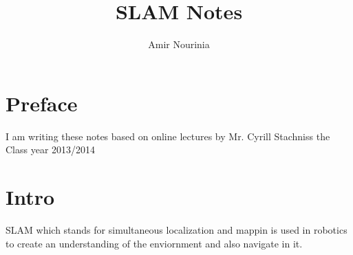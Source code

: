 \documentclass[11pt,twoside,a4paper]{report}
\title{SLAM Notes}
\author{Amir Nourinia}
\begin{document}
    \maketitle
    \tableofcontents


    \section{Preface}
    I am writing these notes based on online lectures by Mr. Cyrill Stachniss the Class year 2013/2014

    \section{Intro}
    
    
    SLAM which stands for simultaneous localization and mappin is used in robotics to create an understanding of the enviornment and also navigate in it.
    
\end{document}
